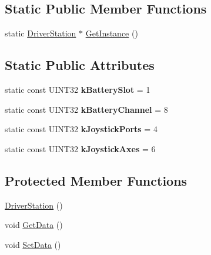 \subsection*{\-Static \-Public \-Member \-Functions}
\begin{DoxyCompactItemize}
\item 
static \hyperlink{classDriverStation}{\-Driver\-Station} $\ast$ \hyperlink{classDriverStation_ab0995c2d3f0b40cb13ac5aff656e46d0}{\-Get\-Instance} ()
\end{DoxyCompactItemize}
\subsection*{\-Static \-Public \-Attributes}
\begin{DoxyCompactItemize}
\item 
\hypertarget{classDriverStation_aa9180c5fbe44a7da026e77ca1cf2a89b}{static const \-U\-I\-N\-T32 {\bfseries k\-Battery\-Slot} = 1}\label{classDriverStation_aa9180c5fbe44a7da026e77ca1cf2a89b}

\item 
\hypertarget{classDriverStation_a9af68ea44c22fff029ef61bd7fefba38}{static const \-U\-I\-N\-T32 {\bfseries k\-Battery\-Channel} = 8}\label{classDriverStation_a9af68ea44c22fff029ef61bd7fefba38}

\item 
\hypertarget{classDriverStation_a02a022d3efcbcd3d7e11b9ec7341f742}{static const \-U\-I\-N\-T32 {\bfseries k\-Joystick\-Ports} = 4}\label{classDriverStation_a02a022d3efcbcd3d7e11b9ec7341f742}

\item 
\hypertarget{classDriverStation_a41b68f0f2844dbaf02e90e59139062ab}{static const \-U\-I\-N\-T32 {\bfseries k\-Joystick\-Axes} = 6}\label{classDriverStation_a41b68f0f2844dbaf02e90e59139062ab}

\end{DoxyCompactItemize}
\subsection*{\-Protected \-Member \-Functions}
\begin{DoxyCompactItemize}
\item 
\hyperlink{classDriverStation_a343945cc9bbf870e0ada94b47f3fec92}{\-Driver\-Station} ()
\item 
void \hyperlink{classDriverStation_a0e394acf2476d1bbfc831c9e5fbd9b41}{\-Get\-Data} ()
\item 
void \hyperlink{classDriverStation_a01eb31617213308c3688a5e863c53449}{\-Set\-Data} ()
\end{DoxyCompactItemize}


